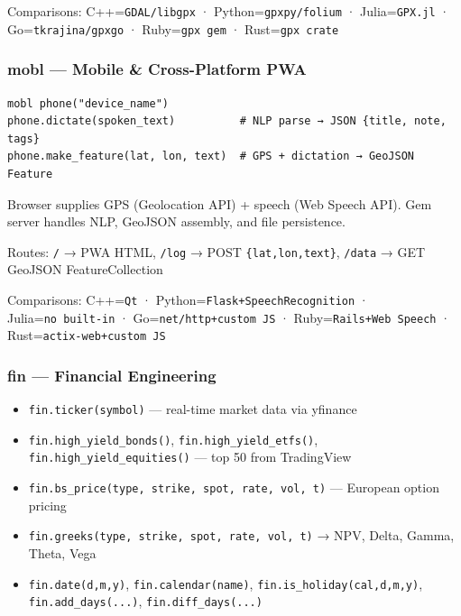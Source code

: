 \documentclass[
]{article}
\providecommand{\tightlist}{%
  \setlength{\itemsep}{0pt}\setlength{\parskip}{0pt}}
\begin{document}
Comparisons: C++=\texttt{GDAL/libgpx} · Python=\texttt{gpxpy/folium} ·
Julia=\texttt{GPX.jl} · Go=\texttt{tkrajina/gpxgo} ·
Ruby=\texttt{gpx\ gem} · Rust=\texttt{gpx\ crate}

\subsubsection{mobl --- Mobile \& Cross-Platform
PWA}\label{mobl-mobile-cross-platform-pwa}

\begin{verbatim}
mobl phone("device_name")
phone.dictate(spoken_text)          # NLP parse → JSON {title, note, tags}
phone.make_feature(lat, lon, text)  # GPS + dictation → GeoJSON Feature
\end{verbatim}

Browser supplies GPS (Geolocation API) + speech (Web Speech API). Gem
server handles NLP, GeoJSON assembly, and file persistence.

Routes: \texttt{/} → PWA HTML, \texttt{/log} → POST
\texttt{\{lat,lon,text\}}, \texttt{/data} → GET GeoJSON
FeatureCollection

Comparisons: C++=\texttt{Qt} · Python=\texttt{Flask+SpeechRecognition} ·
Julia=\texttt{no\ built-in} · Go=\texttt{net/http+custom\ JS} ·
Ruby=\texttt{Rails+Web\ Speech} · Rust=\texttt{actix-web+custom\ JS}

\subsubsection{fin --- Financial
Engineering}\label{fin-financial-engineering}

\begin{itemize}
\tightlist
\item
  \texttt{fin.ticker(symbol)} --- real-time market data via yfinance
\item
  \texttt{fin.high\_yield\_bonds()}, \texttt{fin.high\_yield\_etfs()},
  \texttt{fin.high\_yield\_equities()} --- top 50 from TradingView
\item
  \texttt{fin.bs\_price(type,\ strike,\ spot,\ rate,\ vol,\ t)} ---
  European option pricing
\item
  \texttt{fin.greeks(type,\ strike,\ spot,\ rate,\ vol,\ t)} → NPV,
  Delta, Gamma, Theta, Vega
\item
  \texttt{fin.date(d,m,y)}, \texttt{fin.calendar(name)},
  \texttt{fin.is\_holiday(cal,d,m,y)}, \texttt{fin.add\_days(...)},
  \texttt{fin.diff\_days(...)}
\end{itemize}
\end{document}

